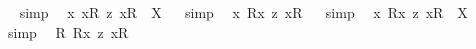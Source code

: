 \begin{isabellebody}
\isadelimproof
\ %
\endisadelimproof
%
\isatagproof
{}\isamarkupfalse%
\ simp\ \isamarkupfalse%
%
\endisatagproof
{\isafoldproof}%
%
\isadelimproof
%
\endisadelimproof
\isanewline
{}\isamarkupfalse%
\ {\isachardoublequoteopen}{\isasymforall}{\isacharparenleft}{\isasymlambda}x{\isachardot}\ {\isacharless}{\isachardot}x{\isachardot}{\isasymcirc}R{}{\isachargreater}\ {\isasymrightarrow}\isactrlsup z\ {\isacharless}{\isachardot}x{\isachardot}{\isasymcirc}R{}{\isachargreater}{\isacharparenright}\ {\isacharequal}\ X{\isachardoublequoteclose}%
\isadelimproof
\ %
\endisadelimproof
%
\isatagproof
{}\isamarkupfalse%
\ simp\ \isamarkupfalse%
%
\endisatagproof
{\isafoldproof}%
%
\isadelimproof
%
\endisadelimproof
\isanewline
\isanewline
{}\isamarkupfalse%
\ {\isachardoublequoteopen}{\isacharbrackleft}{\isasymforall}{\isacharparenleft}{\isasymlambda}x{\isachardot}\ {\isacharless}R{}{\isasymbullet}{\isachardot}x{\isachardot}{\isachargreater}\ {\isasymrightarrow}\isactrlsup z\ {\isacharless}{\isachardot}x{\isachardot}{\isasymcirc}R{}{\isachargreater}{\isacharparenright}{\isacharbrackright}{\isachardoublequoteclose}%
\isadelimproof
\ %
\endisadelimproof
%
\isatagproof
{}\isamarkupfalse%
\ simp\ \isamarkupfalse%
%
\endisatagproof
{\isafoldproof}%
%
\isadelimproof
%
\endisadelimproof
\isanewline
{}\isamarkupfalse%
\ {\isachardoublequoteopen}{\isasymforall}{\isacharparenleft}{\isasymlambda}x{\isachardot}\ {\isacharless}R{}{\isasymbullet}{\isachardot}x{\isachardot}{\isachargreater}\ {\isasymrightarrow}\isactrlsup z\ {\isacharless}{\isachardot}x{\isachardot}{\isasymcirc}R{}{\isachargreater}{\isacharparenright}\ {\isacharequal}\ X{\isachardoublequoteclose}%
\isadelimproof
\ %
\endisadelimproof
%
\isatagproof
{}\isamarkupfalse%
\ simp\ \isamarkupfalse%
%
\endisatagproof
{\isafoldproof}%
%
\isadelimproof
%
\endisadelimproof
\isanewline
{}\isamarkupfalse%
\ {\isachardoublequoteopen}{\isacharbrackleft}{\isasymforall}{\isacharparenleft}{\isasymlambda}R{\isachardot}\ {\isacharless}{\isachardot}R{\isachardot}{\isasymbullet}{\isachardot}x{\isachardot}{\isachargreater}\ {\isasymrightarrow}\isactrlsup z\ {\isacharless}{\isachardot}x{\isachardot}{\isasymcirc}{\isachardot}R{\isachardot}{\isachargreater}{\isacharparenright}{\isacharbrackright}{\isachardoublequoteclose}%
\isadelimproof
\ %
\endisadelimproof
%
\isatagproof
{}\isamarkupfalse%

\end{isabellebody}
